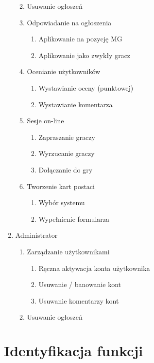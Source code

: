 \begin{enumerate}
\begin{enumerate}
\begin{enumerate}
		\end{enumerate}
	\item Usuwanie ogłoszeń
	\item Odpowiadanie na ogłoszenia
		\begin{enumerate}
		\item Aplikowanie na pozycję MG
		\item Aplikowanie jako zwykły gracz
		\end{enumerate}
	\item Ocenianie użytkowników
		\begin{enumerate}
		\item Wystawianie oceny (punktowej)
		\item Wystawianie komentarza
		\end{enumerate}
	\item Sesje on-line
		\begin{enumerate}
		\item Zapraszanie graczy
		\item Wyrzucanie graczy
		\item Dołączanie do gry
		\end{enumerate}
	\item Tworzenie kart postaci
		\begin{enumerate}
		\item Wybór systemu
		\item Wypełnienie formularza
		\end{enumerate}
	\end{enumerate}

\item Administrator
	\begin{enumerate}
	\item Zarządzanie użytkownikami
		\begin{enumerate}
		\item Ręczna aktywacja konta użytkownika
		\item Usuwanie / banowanie kont
		\item Usuwanie komentarzy kont
		\end{enumerate}
	\item Usuwanie ogłoszeń
	\end{enumerate}
\end{enumerate}



\section{Identyfikacja funkcji}
\label{sec:idfun}

